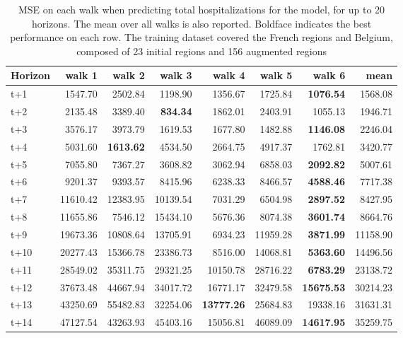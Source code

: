 \begin{table}[H]
\centering
\caption{MSE on each walk when predicting total hospitalizations for the model, for up to 20 horizons. The mean over all walks is also reported. Boldface indicates the best performance on each row. The training dataset covered the French regions and Belgium, composed of 23 initial regions and 156 augmented regions }
\label{tab:MSE_walk_dense_model}
\begin{tabular}{lrrrrrrr}
\toprule
Horizon &    walk 1 &    walk 2 &   walk 3 &   walk 4 &   walk 5 &   walk 6 &     mean \\
\midrule
t+1  & 1547.70  & 2502.84  & 1198.90  & 1356.67  & 1725.84  & \textbf{1076.54}  & 1568.08  \\
t+2  & 2135.48  & 3389.40  & \textbf{834.34}  & 1862.01  & 2403.91  & 1055.13  & 1946.71  \\
t+3  & 3576.17  & 3973.79  & 1619.53  & 1677.80  & 1482.88  & \textbf{1146.08}  & 2246.04  \\
t+4  & 5031.60  & \textbf{1613.62}  & 4534.50  & 2664.75  & 4917.37  & 1762.81  & 3420.77  \\
t+5  & 7055.80  & 7367.27  & 3608.82  & 3062.94  & 6858.03  & \textbf{2092.82}  & 5007.61  \\
t+6  & 9201.37  & 9393.57  & 8415.96  & 6238.33  & 8466.57  & \textbf{4588.46}  & 7717.38  \\
t+7  & 11610.42  & 12383.95  & 10139.54  & 7031.29  & 6504.98  & \textbf{2897.52}  & 8427.95  \\
t+8  & 11655.86  & 7546.12  & 15434.10  & 5676.36  & 8074.38  & \textbf{3601.74}  & 8664.76  \\
t+9  & 19673.36  & 10808.64  & 13705.91  & 6934.23  & 11959.28  & \textbf{3871.99}  & 11158.90  \\
t+10  & 20277.43  & 15366.78  & 23386.73  & 8516.00  & 14068.81  & \textbf{5363.60}  & 14496.56  \\
t+11  & 28549.02  & 35311.75  & 29321.25  & 10150.78  & 28716.22  & \textbf{6783.29}  & 23138.72  \\
t+12  & 37673.48  & 44667.94  & 34017.72  & 16771.17  & 32479.58  & \textbf{15675.53}  & 30214.23  \\
t+13  & 43250.69  & 55482.83  & 32254.06  & \textbf{13777.26}  & 25684.83  & 19338.16  & 31631.31  \\
t+14  & 47127.54  & 43263.93  & 45403.16  & 15056.81  & 46089.09  & \textbf{14617.95}  & 35259.75  \\

\end{tabular}
\end{table}
